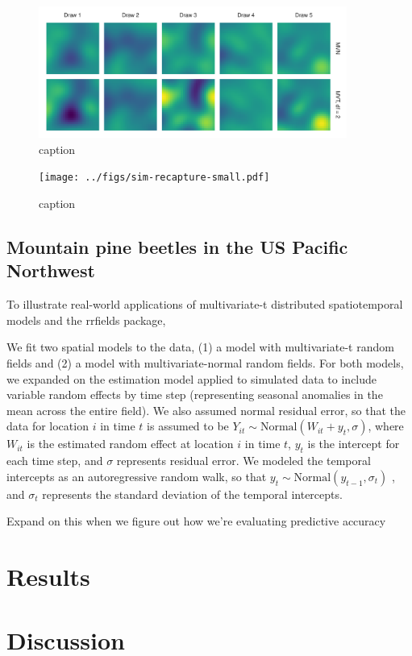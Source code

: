 \documentclass[12pt,english]{article}
\begin{document}
\begin{spacing}{1.05}
\begin{figure}[htb]
\begin{center}
  \includegraphics[width=0.9\textwidth]{../figs/nu-rf-illustration.pdf}
\caption{caption}
\label{fig:didactic}
\end{center}
\end{figure}

\begin{figure}[htb]
\begin{center}
  \texttt{[image: ../figs/sim-recapture-small.pdf]}
\caption{caption}
\label{fig:didactic}
\end{center}
\end{figure}

\subsection{Mountain pine beetles in the US Pacific Northwest}

To illustrate real-world applications of multivariate-t distributed
spatiotemporal models and the rrfields package, 

We fit two spatial models to the data, (1) a model with
multivariate-t random fields and (2) a model with multivariate-normal random
fields. For both models, we expanded on the estimation model applied to
simulated data to include variable random effects by time step (representing
seasonal anomalies in the mean across the entire field). We also assumed normal
residual error, so that the data for location $i$ in time $t$ is
assumed to be 
$Y_{it}\sim \mathrm{Normal}\left(W_{it}+y_t, \sigma \right)$, 
where $W_{it}$ is the estimated random effect
at location $i$ in time $t$, $y_t$ is the intercept for each time
step, and $\sigma$ represents residual error. 
We modeled the temporal intercepts as an autoregressive random walk, 
so that 
$y_t\sim \mathrm{Normal}\left( y_{t-1},\sigma_t \right)$ , and
$\sigma_t$ represents the standard deviation of the temporal intercepts.

Expand on this when we figure out how we're evaluating predictive accuracy

\section{Results}

\section{Discussion}



\end{spacing}
\end{document}
